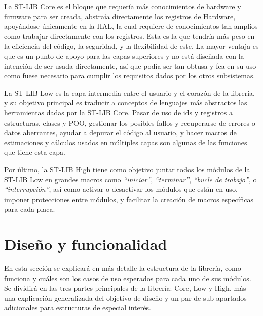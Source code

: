 \documentclass{report}
\begin{document}
La ST-LIB Core es el bloque que requería más conocimientos de hardware y firmware para ser creada, abstraía directamente los registros de Hardware, apoyándose únicamente en la HAL, la cual requiere de conocimientos tan amplios como trabajar directamente con los registros. Esta es la que tendría más peso en la eficiencia del código, la seguridad, y la flexibilidad de este. La mayor ventaja es que es un punto de apoyo para las capas superiores y no está diseñada con la intención de ser usada directamente, así que podía ser tan obtusa y fea en su uso como fuese necesario para cumplir los requisitos dados por los otros subsistemas. \par
La ST-LIB Low es la capa intermedia entre el usuario y el corazón de la librería, y su objetivo principal es traducir a conceptos de lenguajes más abstractos las herramientas dadas por la ST-LIB Core. Pasar de uso de ids y registros a estructuras, clases y POO, gestionar los posibles fallos y recuperarse de errores o datos aberrantes, ayudar a depurar el código al usuario, y hacer macros de estimaciones y cálculos usados en múltiples capas son algunas de las funciones que tiene esta capa. \par
Por último, la ST-LIB High tiene como objetivo juntar todos los módulos de la ST-LIB Low en grandes macros como \textit{``iniciar''}, \textit{``terminar''}, \textit{``bucle de trabajo''}, o \textit{``interrupción''}, así como activar o desactivar los módulos que están en uso, imponer protecciones entre módulos, y facilitar la creación de macros específicas para cada placa. 
\newpage

\section{Diseño y funcionalidad}
En esta sección se explicará en más detalle la estructura de la librería, como funciona y cuáles son los casos de uso esperados para cada uno de sus módulos. Se dividirá en las tres partes principales de la librería: Core, Low y High, más una explicación generalizada del objetivo de diseño y un par de sub-apartados adicionales para estructuras de especial interés.  
\end{document}
